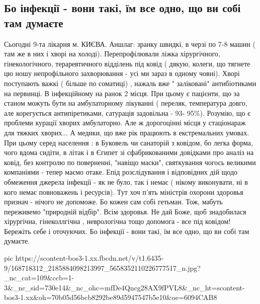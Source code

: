  
 
 
 
 

\subsection{Бо інфекції - вони такі, їм все одно, що ви собі там думаєте}

Сьогодні 9-та лікарня м. КИЄВА. Аншлаг: зранку швидкі, в черзі по 7-8 машин (
там же в них і хворі на холоді). Перепрофілювали ліжка хірургічного,
гінекологічного, тераревтичного відділень під ковід ( дякую, колеги, що тягнете
цю ношу непрофільного захворювання - усі ми зараз в одному човні). Хворі
поступають важкі ( більше по соматиці) , нажаль вже " заліковані" антибіотиками
на первинці. В інфекційному на ранок 2 місця.  При цьому є пацієнти, що за
станом можуть бути на амбулаторному лікуванні ( переляк, температура довго, але
корегується антипіретиками, сатурація задовільна - 93- 95\%). Розумію, що є
проблеми курації хворих амбулаторно. Але ж дорогоцінні місця у стаціонараж для
тяжких хворих... А медики, що вже рік працюють в екстремальних умовах. При
цьому  серед населення : в  Буковель чи санаторій з ковідом, бо легка форма,
чого вдома сидіти, в літак і в Єгипет зі сфабрикованими довідками про аналіз на
ковід, без контролю по поверненні, "навіщо маски", святкування  чогось великими
компаніями - тепер маємо отаке. Епід розслідування і відповідних дій щодо
обмеження джерела інфекції - як не було, так і немає ( нікому виконувати, ні в
кого немає повноважень і ресурсів). Тут хоч п'ять міністрів охорони здоровья
признач - нічого не допоможе. Бо кожен сам собі гетьман. Тож, мабуть переживемо
"природній відбір". Всім здоровья. Не дай Боже, щоб знадобилася хірургічна,
гінеколлгічна , неврологічна тощо допомога - все під ковідом! Бережіть себе і
оточуючих. Бо інфекції - вони такі, їм все одно, що ви собі там думаєте.

\ifcmt
  pic https://scontent-bos3-1.xx.fbcdn.net/v/t1.6435-9/168718312_2185884098213997_5658352110226777517_n.jpg?_nc_cat=109&ccb=1-3&_nc_sid=730e14&_nc_ohc=mfDe4Qncg28AX9fPVL8&_nc_ht=scontent-bos3-1.xx&oh=70b05d56bcb8292be89d5947547b5e10&oe=6094CAB8
\fi

